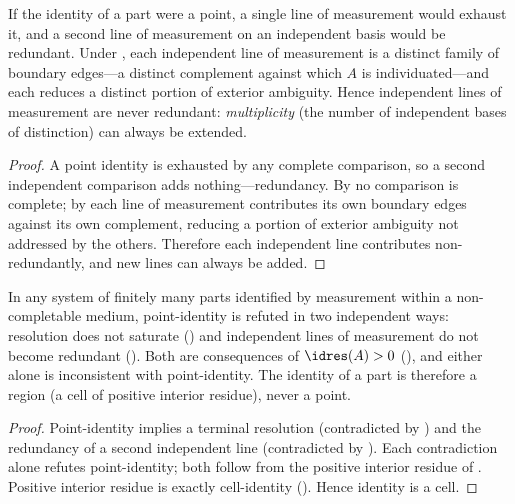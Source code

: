 \begin{proposition}
\label{prop:multiplicity}
If the identity of a part were a point, a single line of measurement would exhaust
it, and a second line of measurement on an independent basis would be redundant.
Under , each independent line of measurement is a distinct
family of boundary edges---a distinct complement against which $A$ is
individuated---and each reduces a distinct portion of exterior ambiguity. Hence
independent lines of measurement are never redundant: \emph{multiplicity}
\textup{(}the number of independent bases of distinction\textup{)} can always be
extended.
\end{proposition}

\begin{proof}
A point identity is exhausted by any complete comparison, so a second independent
comparison adds nothing---redundancy. By  no comparison is
complete; by  each line of measurement contributes its
own boundary edges against its own complement, reducing a portion of exterior
ambiguity not addressed by the others. Therefore each independent line contributes
non-redundantly, and new lines can always be added.
\end{proof}

\begin{theorem}
\label{thm:falsification}
In any system of finitely many parts identified by measurement within a
non-completable medium, point-identity is refuted in two independent ways:
resolution does not saturate \textup{(}\textup{)} and
independent lines of measurement do not become redundant
\textup{(}\textup{)}. Both are consequences of
$\idres(A)>0$ \textup{(}\textup{)}, and either alone is
inconsistent with point-identity. The identity of a part is therefore a region
\textup{(}a cell of positive interior residue\textup{)}, never a point.
\end{theorem}

\begin{proof}
Point-identity implies a terminal resolution (contradicted by
) and the redundancy of a second independent line
(contradicted by ). Each contradiction alone refutes
point-identity; both follow from the positive interior residue of
. Positive interior residue is exactly cell-identity
(). Hence identity is a cell.
\end{proof}


